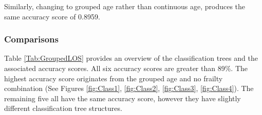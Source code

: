 \documentclass[../thesis.tex]{subfiles}
\begin{document}
Similarly, changing to grouped age rather than continuous age, produces the same accuracy score of 0.8959.


\subsubsection{Comparisons}
Table \ref{Tab:GroupedLOS} provides an overview of the classification trees and the associated accuracy scores. All six accuracy scores are greater than 89\%. The highest accuracy score originates from the grouped age and no frailty combination (See Figures \ref{fig:Class1}, \ref{fig:Class2}, \ref{fig:Class3}, \ref{fig:Class4}). The remaining five all have the same accuracy score, however they have slightly different classification tree structures.

\begin{table}[h!]
\begin{adjustwidth}{0cm}{}
\centering{}
\caption{Grouped LOS Accuracy Results}
\label{Tab:GroupedLOS}
\end{adjustwidth}
\end{table}
\end{document}
